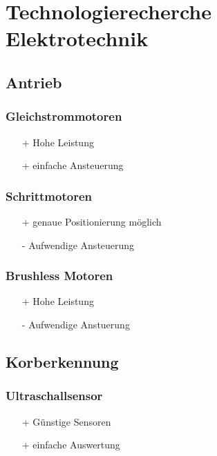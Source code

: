 \section{Technologierecherche Elektrotechnik}

\subsection{Antrieb}

\subsubsection{Gleichstrommotoren}
\begin{itemize}
    \item[+] Hohe Leistung
    \item[+] einfache Ansteuerung
\end{itemize}

\subsubsection{Schrittmotoren}
\begin{itemize}
    \item[+] genaue Positionierung möglich
    \item[-] Aufwendige Ansteuerung
\end{itemize}

\subsubsection{Brushless Motoren}
\begin{itemize}
    \item[+] Hohe Leistung
    \item[-] Aufwendige Anstuerung
\end{itemize}

\subsection{Korberkennung}

\subsubsection{Ultraschallsensor}
\begin{itemize}
    \item[+] Günstige Sensoren
    \item[+] einfache Auswertung
\end{itemize}

